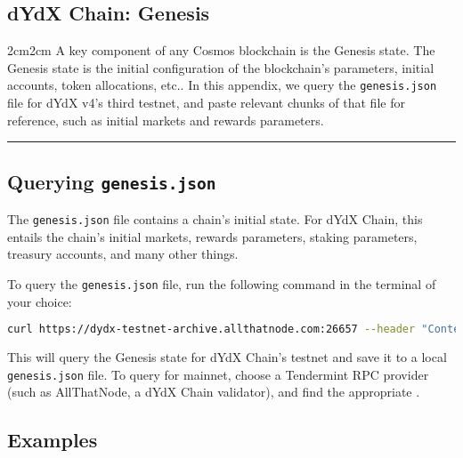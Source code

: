 \begin{fullwidth}
    \section{dYdX Chain: Genesis} \label{app:genesis}

    \begin{adjustwidth}{2cm}{2cm}
        \justify
        A key component of any Cosmos blockchain is the Genesis state. The Genesis state is the initial configuration of the blockchain's parameters, initial accounts, token allocations, etc.. In this appendix, we query the \texttt{genesis.json} file for dYdX v4's third testnet, and paste relevant chunks of that file for reference, such as initial markets and rewards parameters.
    \end{adjustwidth}

    \textcolor{gray}{\rule{\linewidth}{0.1mm}}
\end{fullwidth}

    \subsection{Querying \texttt{genesis.json}}

        The \texttt{genesis.json} file contains a chain's initial state. For dYdX Chain, this entails the chain's initial markets, rewards parameters, staking parameters, treasury accounts, and many other things. 

        To query the \texttt{genesis.json} file, run the following command in the terminal of your choice:

        \begin{lstlisting}[language=bash]
            curl https://dydx-testnet-archive.allthatnode.com:26657 --header "Content-Type: application/json" --request GET --data '{"jsonrpc":"2.0", "id":1, "method":"genesis"}' > genesis.json
        \end{lstlisting}

        This will query the Genesis state for dYdX Chain's testnet and save it to a local \texttt{genesis.json} file. To query for mainnet, choose a Tendermint RPC provider (such as AllThatNode, a dYdX Chain validator), and find the appropriate . 

    \subsection{Examples}

